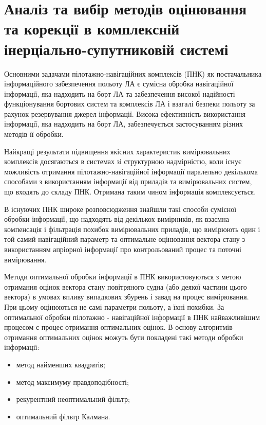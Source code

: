 \section{Аналіз та вибір методів оцінювання та корекції в комплексній інерціально-супутниковій системі}

Основними задачами пілотажно-навігаційних комплексів (ПНК) як постачальника 
інформаційного забезпечення польоту ЛА є сумісна обробка навігаційної інформації, 
яка надходить на борт ЛА та забезпечення високої надійності функціонування бортових 
систем та комплексів ЛА і взагалі безпеки польоту за рахунок резервування 
джерел інформації. Висока ефективність використання інформації, яка 
надходить на борт ЛА, забезпечується застосуванням різних методів її обробки. 

Найкращі результати підвищення якісних характеристик вимірювальних комплексів 
досягаються  в системах зі структурною надмірністю, коли існує можливість 
отримання пілотажно-навігаційної інформації паралельно декількома способами з 
використанням інформації від приладів та вимірювальних систем, що входять до 
складу ПНК. Отримана таким чином інформація комплексується.

В існуючих ПНК широке розповсюдження знайшли такі способи сумісної обробки 
інформації, що надходять від декількох вимірників, як взаємна компенсація і 
фільтрація похибок вимірювальних приладів, що вимірюють один і той самий 
навігаційний параметр та оптимальне оцінювання вектора стану з використанням 
апріорної інформації про контрольований процес та поточні вимірювання.

Методи оптимальної обробки інформації в ПНК використовуються з метою 
отримання оцінок вектора стану повітряного судна (або деякої частини 
цього вектора) в умовах впливу випадкових збурень і завад на процес 
вимірювання. При цьому оцінюються не самі параметри польоту, а їхні похибки. 
За оптимальної обробки пілотажно - навігаційної інформації в ПНК найважливішим 
процесом є процес отримання оптимальних оцінок. В основу алгоритмів отримання 
оптимальних оцінок можуть бути покладені такі методи обробки інформації:
\begin{itemize}
 \item метод найменших квадратів;
 \item метод максимуму правдоподібності;
 \item рекурентний неоптимальний фільтр;
 \item оптимальний фільтр Калмана.
\end{itemize}



